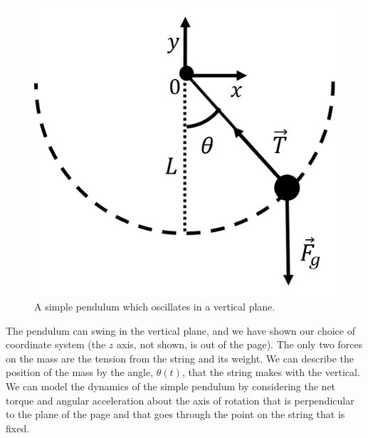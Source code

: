 \begin{figure}[!htbp]
\centering
\includegraphics[width=0.3\linewidth]{files/simplep-b3f8d339f98d4ddd93972dc7996f4e89.png}
\caption[]{A simple pendulum which oscillates in a vertical plane.}
\label{fig:simpleharmonicmotion:simplep}
\end{figure}

The pendulum can swing in the vertical plane, and we have shown our choice of coordinate system (the $z$ axis, not shown, is out of the page). The only two forces on the mass are the tension from the string and its weight. We can describe the position of the mass by the angle, $\theta(t)$, that the string makes with the vertical. We can model the dynamics of the simple pendulum by considering the net torque and angular acceleration about the axis of rotation that is perpendicular to the plane of the page and that goes through the point on the string that is fixed.

